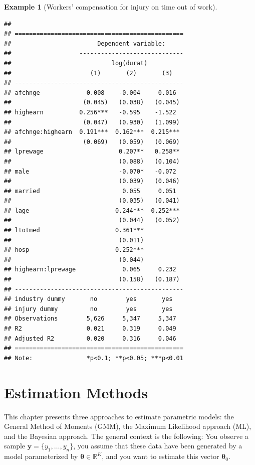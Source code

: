 \documentclass[
  12pt,
]{book}
\theoremstyle{definition}
\theoremstyle{definition}
\newtheorem{example}{Example}[chapter]
\theoremstyle{definition}
\theoremstyle{definition}
\theoremstyle{remark}
\begin{document}
\begin{example}[Workers' compensation for injury on time out of work]
\begin{verbatim}
## 
## ===============================================
##                        Dependent variable:     
##                   -----------------------------
##                            log(durat)          
##                      (1)       (2)       (3)   
## -----------------------------------------------
## afchnge             0.008    -0.004     0.016  
##                    (0.045)   (0.038)   (0.045) 
## highearn          0.256***   -0.595    -1.522  
##                    (0.047)   (0.930)   (1.099) 
## afchnge:highearn  0.191***  0.162***  0.215*** 
##                    (0.069)   (0.059)   (0.069) 
## lprewage                     0.207**   0.258** 
##                              (0.088)   (0.104) 
## male                         -0.070*   -0.072  
##                              (0.039)   (0.046) 
## married                       0.055     0.051  
##                              (0.035)   (0.041) 
## lage                        0.244***  0.252*** 
##                              (0.044)   (0.052) 
## ltotmed                     0.361***           
##                              (0.011)           
## hosp                        0.252***           
##                              (0.044)           
## highearn:lprewage             0.065     0.232  
##                              (0.158)   (0.187) 
## -----------------------------------------------
## industry dummy       no        yes       yes   
## injury dummy         no        yes       yes   
## Observations        5,626     5,347     5,347  
## R2                  0.021     0.319     0.049  
## Adjusted R2         0.020     0.316     0.046  
## ===============================================
## Note:               *p<0.1; **p<0.05; ***p<0.01
\end{verbatim}

\end{example}

\hypertarget{estimation-methods}{%
\chapter{Estimation Methods}\label{estimation-methods}}

This chapter presents three approaches to estimate parametric models: the General Method of Moments (GMM), the Maximum Likelihood approach (ML), and the Bayesian approach. The general context is the following: You observe a sample \(\mathbf{y}=\{y_1,\dots,y_n\}\), you assume that these data have been generated by a model parameterized by \({\boldsymbol\theta} \in \mathbb{R}^K\), and you want to estimate this vector \({\boldsymbol\theta}_0\).
\end{document}

